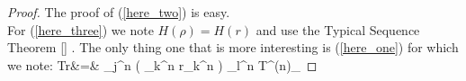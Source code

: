 \documentclass[aps,11pt,twoside,letterpaper]{article}
\def \Tr{\textup{Tr}}
\theoremstyle{plain}
\theoremstyle{definition}
\begin{document}
\begin{proof}
The proof of (\ref{here_two}) is easy.\\
For (\ref{here_three}) we note $H(\rho) = H(r)$ and use the Typical Sequence Theorem \ref{} .
The only thing one that is more interesting is (\ref{here_one}) for which we note:
\bea
\Tr{} 	&=&	\sum_{j^n}  \left(
										\sum_{k^n} r_{k^n}\ket{k^n}\bra{k^n}  \right)
										\sum_{l^n \in T^{(n)}_\epsilon} 
\eea


\end{proof}
%


\end{document}
